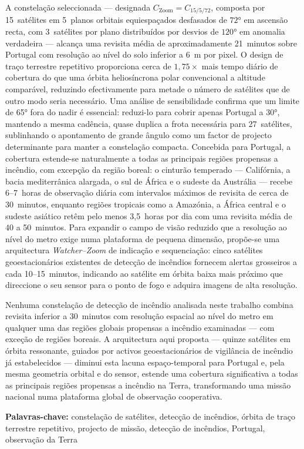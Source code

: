 A constelação seleccionada --- designada $C_{\text{Zoom}} = C_{15/5/72}$, composta por 15~satélites em 5~planos orbitais equiespaçados desfasados de $72°$ em ascensão recta, com 3~satélites por plano distribuídos por desvios de $120°$ em anomalia verdadeira --- alcança uma revisita média de aproximadamente 21~minutos sobre Portugal com resolução ao nível do solo inferior a 6~m por pixel.
O design de traço terrestre repetitivo proporciona cerca de $1{,}75\times$ mais tempo diário de cobertura do que uma órbita heliosíncrona polar convencional a altitude comparável, reduzindo efectivamente para metade o número de satélites que de outro modo seria necessário.
Uma análise de sensibilidade confirma que um limite de 65° fora do nadir é essencial: reduzi-lo para cobrir apenas Portugal a 30°, mantendo a mesma cadência, quase duplica a frota necessária para 27~satélites, sublinhando o apontamento de grande ângulo como um factor de projecto determinante para manter a constelação compacta.
Concebida para Portugal, a cobertura estende-se naturalmente a todas as principais regiões propensas a incêndio, com excepção da região boreal: o cinturão temperado --- Califórnia, a bacia mediterrânica alargada, o sul de África e o sudeste da Austrália --- recebe 6--7~horas de observação diária com intervalos máximos de revisita de cerca de 30~minutos, enquanto regiões tropicais como a Amazónia, a África central e o sudeste asiático retêm pelo menos 3,5~horas por dia com uma revisita média de 40 a 50~minutos.
Para expandir o campo de visão reduzido que a resolução ao nível do metro exige numa plataforma de pequena dimensão, propõe-se uma arquitectura \emph{Watcher--Zoom} de indicação e sequenciação: cinco satélites geoestacionários existentes de detecção de incêndios fornecem alertas grosseiros a cada 10--15~minutos, indicando ao satélite em órbita baixa mais próximo que direccione o seu sensor para o ponto de fogo e adquira imagens de alta resolução.

Nenhuma constelação de detecção de incêndio analisada neste trabalho combina revisita inferior a 30~minutos com resolução espacial ao nível do metro em qualquer uma das regiões globais propensas a incêndio examinadas --- com exceção de regiões boreais.
A arquitectura aqui proposta --- quinze satélites em órbita ressonante, guiados por activos geoestacionários de vigilância de incêndio já estabelecidos --- diminui esta lacuna espaço-temporal para Portugal e, pela mesma geometria orbital e do sensor, estende uma cobertura significativa a todas as principais regiões propensas a incêndio na Terra, transformando uma missão nacional numa plataforma global de observação cooperativa.


\vspace{1em}
\noindent\textbf{Palavras-chave:} constelação de satélites, detecção de incêndios, órbita de traço terrestre repetitivo, projecto de missão, detecção de incêndios, Portugal, observação da Terra
